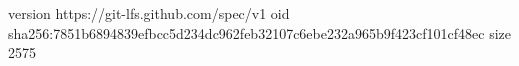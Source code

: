 version https://git-lfs.github.com/spec/v1
oid sha256:7851b6894839efbcc5d234dc962feb32107c6ebe232a965b9f423cf101cf48ec
size 2575
